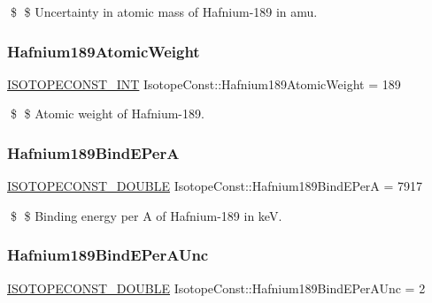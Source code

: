\$ \$ Uncertainty in atomic mass of Hafnium-\/189 in amu. \mbox{\label{group___isotope_const-_hafnium-_hf189_gaa1ab9a8add36ec927134238f1566ce43}} 
\subsubsection{\texorpdfstring{Hafnium189\+Atomic\+Weight}{Hafnium189AtomicWeight}}
{\footnotesize\ttfamily \mbox{\hyperlink{group___isotope_const-_macros_ga5f18360b3e99483a35c32d789e62621c}{I\+S\+O\+T\+O\+P\+E\+C\+O\+N\+S\+T\+\_\+\+I\+NT}} Isotope\+Const\+::\+Hafnium189\+Atomic\+Weight = 189}

\$ \$ Atomic weight of Hafnium-\/189. \mbox{\label{group___isotope_const-_hafnium-_hf189_gaf21e41a17ae5681e6a2541403bd5778d}} 
\subsubsection{\texorpdfstring{Hafnium189\+Bind\+E\+PerA}{Hafnium189BindEPerA}}
{\footnotesize\ttfamily \mbox{\hyperlink{group___isotope_const-_macros_ga8f45a7272ce02c0b4c65c44636ed719a}{I\+S\+O\+T\+O\+P\+E\+C\+O\+N\+S\+T\+\_\+\+D\+O\+U\+B\+LE}} Isotope\+Const\+::\+Hafnium189\+Bind\+E\+PerA = 7917}

\$ \$ Binding energy per A of Hafnium-\/189 in keV. \mbox{\label{group___isotope_const-_hafnium-_hf189_ga84cb4908e32fc9a98a0e080dd2dd4e07}} 
\subsubsection{\texorpdfstring{Hafnium189\+Bind\+E\+Per\+A\+Unc}{Hafnium189BindEPerAUnc}}
{\footnotesize\ttfamily \mbox{\hyperlink{group___isotope_const-_macros_ga8f45a7272ce02c0b4c65c44636ed719a}{I\+S\+O\+T\+O\+P\+E\+C\+O\+N\+S\+T\+\_\+\+D\+O\+U\+B\+LE}} Isotope\+Const\+::\+Hafnium189\+Bind\+E\+Per\+A\+Unc = 2}

